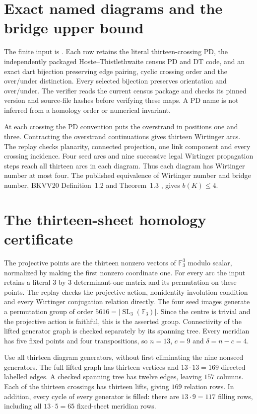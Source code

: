 \documentclass[11pt]{article}
\newcommand{\F}{\mathbb F}
\begin{document}
\section{Exact named diagrams and the bridge upper bound}

The finite input is .
Each row retains the literal thirteen-crossing PD, the independently
packaged Hoste--Thistlethwaite census PD and DT code, and an exact dart
bijection preserving edge pairing, cyclic crossing order and the
over/under distinction. Every selected bijection preserves orientation
and over/under. The verifier reads the current census package and checks
its pinned version and source-file hashes before verifying these maps.
A PD name is not inferred from a homology order or numerical invariant.

At each crossing the PD convention puts the overstrand in positions
one and three. Contracting the overstrand continuations gives thirteen
Wirtinger arcs. The replay checks planarity, connected projection,
one link component and every crossing incidence. Four seed arcs and
nine successive legal Wirtinger propagation steps reach all thirteen
arcs in each diagram. Thus each diagram has Wirtinger number at most
four. The published equivalence of Wirtinger number and bridge number,
BKVV20 Definition~1.2 and Theorem~1.3
\cite[printed pp.~245--246]{bkvv}, gives $b(K)\le4$.

\section{The thirteen-sheet homology certificate}

The projective points are the thirteen nonzero vectors of $\F_3^3$
modulo scalar, normalized by making the first nonzero coordinate one.
For every arc the input retains a literal $3$ by $3$ determinant-one
matrix and its permutation on these points. The replay checks the
projective action, nonidentity involution condition and every
Wirtinger conjugation relation directly. The four seed images generate
a permutation group of order $5616=|\operatorname{SL}_3(\F_3)|$.
Since the centre is trivial and the projective action is faithful,
this is the asserted group. Connectivity of the lifted generator
graph is checked separately by its spanning tree. Every meridian has
five fixed points and four transpositions, so $n=13$, $c=9$ and
$\delta=n-c=4$.

Use all thirteen diagram generators, without first eliminating the nine
nonseed generators. The full lifted graph has thirteen vertices and
$13\cdot13=169$ directed labelled edges. A checked spanning tree has
twelve edges, leaving $157$ columns. Each of the thirteen crossings
has thirteen lifts, giving $169$ relation rows. In addition, every cycle
of every generator is filled: there are $13\cdot9=117$ filling rows,
including all $13\cdot5=65$ fixed-sheet meridian rows.
\end{document}
